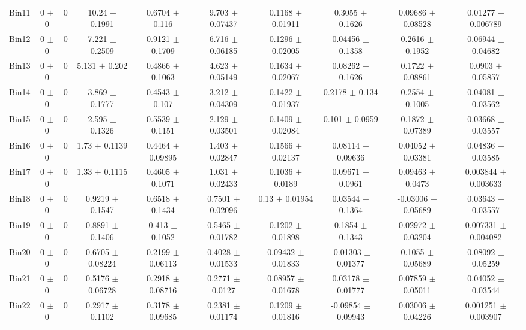 \begin{tabular}{@{\extracolsep{4pt}}lccccccccc@{}}
     Bin11 & 0 $\pm$ 0 & 0 & 10.24 $\pm$ 0.1991 & 0.6704 $\pm$ 0.116 & 9.703 $\pm$ 0.07437 & 0.1168 $\pm$ 0.01911 & 0.3055 $\pm$ 0.1626 & 0.09686 $\pm$ 0.08528 & 0.01277 $\pm$ 0.006789 \\ 
     Bin12 & 0 $\pm$ 0 & 0 & 7.221 $\pm$ 0.2509 & 0.9121 $\pm$ 0.1709 & 6.716 $\pm$ 0.06185 & 0.1296 $\pm$ 0.02005 & 0.04456 $\pm$ 0.1358 & 0.2616 $\pm$ 0.1952 & 0.06944 $\pm$ 0.04682 \\ 
     Bin13 & 0 $\pm$ 0 & 0 & 5.131 $\pm$ 0.202 & 0.4866 $\pm$ 0.1063 & 4.623 $\pm$ 0.05149 & 0.1634 $\pm$ 0.02067 & 0.08262 $\pm$ 0.1626 & 0.1722 $\pm$ 0.08861 & 0.0903 $\pm$ 0.05857 \\ 
     Bin14 & 0 $\pm$ 0 & 0 & 3.869 $\pm$ 0.1777 & 0.4543 $\pm$ 0.107 & 3.212 $\pm$ 0.04309 & 0.1422 $\pm$ 0.01937 & 0.2178 $\pm$ 0.134 & 0.2554 $\pm$ 0.1005 & 0.04081 $\pm$ 0.03562 \\ 
     Bin15 & 0 $\pm$ 0 & 0 & 2.595 $\pm$ 0.1326 & 0.5539 $\pm$ 0.1151 & 2.129 $\pm$ 0.03501 & 0.1409 $\pm$ 0.02084 & 0.101 $\pm$ 0.0959 & 0.1872 $\pm$ 0.07389 & 0.03668 $\pm$ 0.03557 \\ 
     Bin16 & 0 $\pm$ 0 & 0 & 1.73 $\pm$ 0.1139 & 0.4464 $\pm$ 0.09895 & 1.403 $\pm$ 0.02847 & 0.1566 $\pm$ 0.02137 & 0.08114 $\pm$ 0.09636 & 0.04052 $\pm$ 0.03381 & 0.04836 $\pm$ 0.03585 \\ 
     Bin17 & 0 $\pm$ 0 & 0 & 1.33 $\pm$ 0.1115 & 0.4605 $\pm$ 0.1071 & 1.031 $\pm$ 0.02433 & 0.1036 $\pm$ 0.0189 & 0.09671 $\pm$ 0.0961 & 0.09463 $\pm$ 0.0473 & 0.003844 $\pm$ 0.003633 \\ 
     Bin18 & 0 $\pm$ 0 & 0 & 0.9219 $\pm$ 0.1547 & 0.6518 $\pm$ 0.1434 & 0.7501 $\pm$ 0.02096 & 0.13 $\pm$ 0.01954 & 0.03544 $\pm$ 0.1364 & -0.03006 $\pm$ 0.05689 & 0.03643 $\pm$ 0.03557 \\ 
     Bin19 & 0 $\pm$ 0 & 0 & 0.8891 $\pm$ 0.1406 & 0.413 $\pm$ 0.1052 & 0.5465 $\pm$ 0.01782 & 0.1202 $\pm$ 0.01898 & 0.1854 $\pm$ 0.1343 & 0.02972 $\pm$ 0.03204 & 0.007331 $\pm$ 0.004082 \\ 
     Bin20 & 0 $\pm$ 0 & 0 & 0.6705 $\pm$ 0.08224 & 0.2199 $\pm$ 0.06113 & 0.4028 $\pm$ 0.01533 & 0.09432 $\pm$ 0.01833 & -0.01303 $\pm$ 0.01377 & 0.1055 $\pm$ 0.05689 & 0.08092 $\pm$ 0.05259 \\ 
     Bin21 & 0 $\pm$ 0 & 0 & 0.5176 $\pm$ 0.06728 & 0.2918 $\pm$ 0.08716 & 0.2771 $\pm$ 0.0127 & 0.08957 $\pm$ 0.01678 & 0.03178 $\pm$ 0.01777 & 0.07859 $\pm$ 0.05011 & 0.04052 $\pm$ 0.03544 \\ 
     Bin22 & 0 $\pm$ 0 & 0 & 0.2917 $\pm$ 0.1102 & 0.3178 $\pm$ 0.09685 & 0.2381 $\pm$ 0.01174 & 0.1209 $\pm$ 0.01816 & -0.09854 $\pm$ 0.09943 & 0.03006 $\pm$ 0.04226 & 0.001251 $\pm$ 0.003907 \\ 

\end{tabular}
